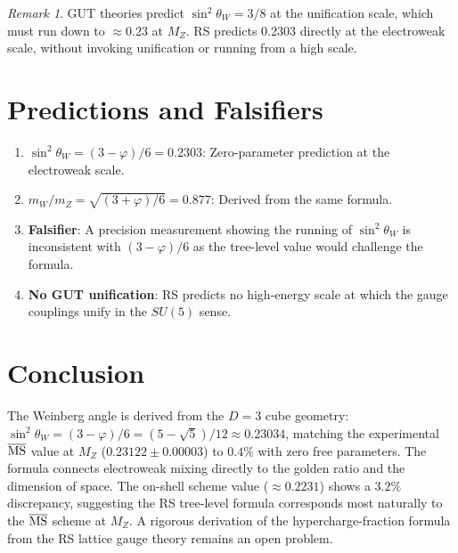 \documentclass[12pt,a4paper]{article}
\theoremstyle{definition}
\theoremstyle{remark}
\newtheorem{remark}[theorem]{Remark}
\begin{document}
\begin{remark}
GUT theories predict $\sin^2\theta_W = 3/8$ at the unification
scale, which must run down to $\approx 0.23$ at $M_Z$.  RS
predicts $0.2303$ directly at the electroweak scale, without
invoking unification or running from a high scale.
\end{remark}

\section{Predictions and Falsifiers}
\label{sec:predictions}

\begin{enumerate}
  \item \textbf{$\sin^2\theta_W = (3-\varphi)/6 = 0.2303$}:
  Zero-parameter prediction at the electroweak scale.

  \item \textbf{$m_W/m_Z = \sqrt{(3+\varphi)/6} = 0.877$}:
  Derived from the same formula.

  \item \textbf{Falsifier}: A precision measurement showing
  the running of $\sin^2\theta_W$ is inconsistent with
  $(3-\varphi)/6$ as the tree-level value would challenge the
  formula.

  \item \textbf{No GUT unification}: RS predicts no high-energy
  scale at which the gauge couplings unify in the $SU(5)$ sense.
\end{enumerate}

\section{Conclusion}
\label{sec:conclusion}

The Weinberg angle is derived from the $D = 3$ cube geometry:
$\sin^2\theta_W = (3-\varphi)/6 = (5-\sqrt{5})/12 \approx 0.23034$,
matching the experimental $\overline{\rm MS}$ value at $M_Z$
($0.23122 \pm 0.00003$) to $0.4\%$ with zero free parameters.
The formula connects electroweak mixing directly to the golden ratio
and the dimension of space.  The on-shell scheme value ($\approx
0.2231$) shows a $3.2\%$ discrepancy, suggesting the RS tree-level
formula corresponds most naturally to the $\overline{\rm MS}$ scheme
at $M_Z$.  A rigorous derivation of the hypercharge-fraction formula
from the RS lattice gauge theory remains an open problem.
\end{document}
